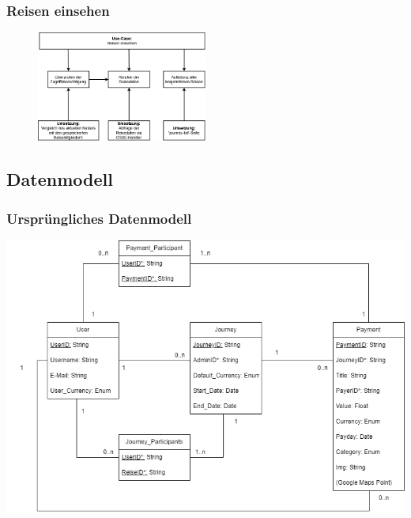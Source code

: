 \subsubsection{Reisen einsehen}

	\begin{figure}[H]
		\centering
		\includegraphics[width=0.5\textwidth]{img/diagrams/Anforderung-Reise_einsehen}
	\end{figure}

\newpage

\subsection{Datenmodell}

\subsubsection{Ursprüngliches Datenmodell}
\includegraphics[width=170mm]{img/diagrams/Geplantes_UML.drawio}

